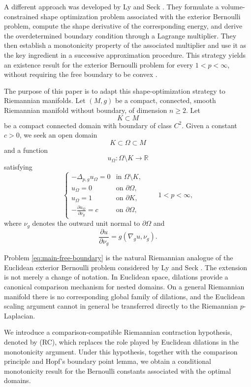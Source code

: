 \documentclass[11pt,a4paper]{article}
\theoremstyle{definition}
\theoremstyle{remark}
\newcommand{\R}{\mathbb{R}}
\newcommand{\gradg}{\nabla_g}
\newcommand{\plapg}{\Delta_{p,g}}
\begin{document}
A different approach was developed by Ly and Seck
\cite{LySeck2003}. They formulate a volume-constrained shape
optimization problem associated with the exterior Bernoulli problem,
compute the shape derivative of the corresponding energy, and
derive the overdetermined boundary condition through a Lagrange
multiplier. They then establish a monotonicity property of the
associated multiplier and use it as the key ingredient in a
successive approximation procedure. This strategy yields an
existence result for the exterior Bernoulli problem for every
$1<p<\infty$, without requiring the free boundary to be convex
\cite{LySeck2003}.

The purpose of this paper is to adapt this shape-optimization
strategy to Riemannian manifolds. Let $(M,g)$ be a compact,
connected, smooth Riemannian manifold without boundary, of dimension
$n\geq2$. Let
\[
K\subset M
\]
be a compact connected domain with boundary of class $C^2$. Given a
constant $c>0$, we seek an open domain
\[
K\subset\Omega\subset M
\]
and a function
\[
u_\Omega:\Omega\setminus K\longrightarrow\R
\]
satisfying
\begin{equation}
\begin{cases}
-\plapg u_\Omega=0
&\text{in }\Omega\setminus K,\\
u_\Omega=0
&\text{on }\partial\Omega,\\
u_\Omega=1
&\text{on }\partial K,\\
-\displaystyle\frac{\partial u_\Omega}{\partial\nu_g}=c
&\text{on }\partial\Omega,
\end{cases}
\qquad 1<p<\infty,
\label{eq:main-free-boundary}
\end{equation}
where $\nu_g$ denotes the outward unit normal to $\partial\Omega$ and
\[
\frac{\partial u}{\partial\nu_g}
=
g(\gradg u,\nu_g).
\]

Problem \eqref{eq:main-free-boundary} is the natural Riemannian
analogue of the Euclidean exterior Bernoulli problem considered by
Ly and Seck \cite{LySeck2003}. The extension is not merely a change
of notation. In Euclidean space, dilations provide a canonical
comparison mechanism for nested domains. On a general Riemannian
manifold there is no corresponding global family of dilations, and
the Euclidean scaling argument cannot in general be transferred
directly to the Riemannian $p$-Laplacian.

We introduce a comparison-compatible Riemannian
contraction hypothesis, denoted by {\rm (RC)}, which replaces the
role played by Euclidean dilations in the monotonicity argument.
Under this hypothesis, together with the comparison principle and
Hopf's boundary point lemma, we obtain a conditional monotonicity
result for the Bernoulli constants associated with the optimal
domains.
\end{document}
